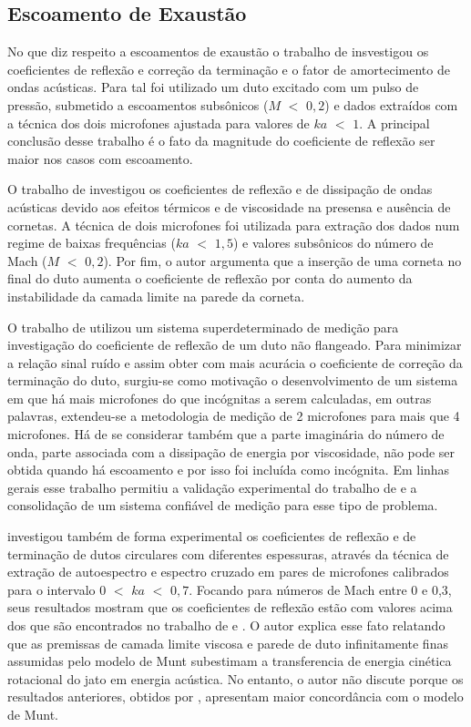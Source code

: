 \subsection{Escoamento de Exaustão}

No que diz respeito a escoamentos de exaustão o trabalho de  insvestigou os coeficientes de reflexão e correção da terminação e o fator de amortecimento de ondas acústicas. Para tal foi utilizado um duto excitado com um pulso de pressão, submetido a escoamentos subsônicos ($M$ $<$ $0,2$) e dados extraídos com a técnica dos dois microfones ajustada para valores de $ka$ $<$ $1$. A principal conclusão desse trabalho é o fato da magnitude do coeficiente de reflexão ser maior nos casos com escoamento.

O trabalho de  investigou os coeficientes de reflexão e de dissipação de ondas acústicas devido aos efeitos térmicos e de viscosidade na presensa e ausência de cornetas. A técnica de dois microfones foi utilizada para extração dos dados num regime de baixas frequências ($ka$ $<$ $1,5$) e valores subsônicos do número de Mach ($M$ $<$ $0,2$). Por fim, o autor argumenta que a inserção de uma corneta no final do duto aumenta o coeficiente de reflexão por conta do aumento da instabilidade da camada limite na parede da corneta.

O trabalho de  utilizou um sistema superdeterminado de medição para investigação do coeficiente de reflexão de um duto não flangeado. Para minimizar a relação sinal ruído e assim obter com mais acurácia o coeficiente de correção da terminação do duto, surgiu-se como motivação o desenvolvimento de um sistema em que há mais microfones do que incógnitas a serem calculadas, em outras palavras, extendeu-se a metodologia de medição de 2 microfones para mais que 4 microfones. Há de se considerar também que a parte imaginária do número de onda, parte associada com a dissipação de energia por viscosidade, não pode ser obtida quando há escoamento e por isso foi incluída como incógnita. Em linhas gerais esse trabalho permitiu a validação experimental do trabalho de  e a consolidação de um sistema confiável de medição para esse tipo de problema.

 investigou também de forma experimental os coeficientes de reflexão e de terminação de dutos circulares com diferentes espessuras, através da técnica de extração de autoespectro e espectro cruzado em pares de microfones calibrados para o intervalo $0$ $<$ $ka$ $<$ $0,7$. Focando para números de Mach entre 0 e 0,3, seus resultados mostram que os coeficientes de reflexão estão com valores acima dos que são encontrados no trabalho de  e . O autor explica esse fato relatando que as premissas de camada limite viscosa e parede de duto infinitamente finas assumidas pelo modelo de Munt subestimam a transferencia de energia cinética rotacional do jato em energia acústica. No entanto, o autor não discute porque os resultados anteriores, obtidos por , apresentam maior concordância com o modelo de Munt. 



